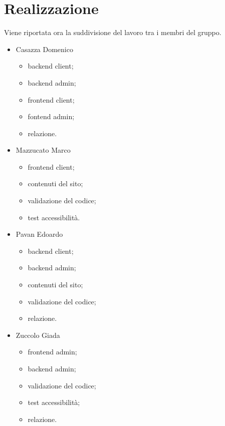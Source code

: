 \section{Realizzazione}
Viene riportata ora la suddivisione del lavoro tra i membri del gruppo.
\begin{itemize}
	\item Casazza Domenico
	\begin{itemize}
		\item backend client;
		\item backend admin;
		\item frontend client;
		\item fontend admin;
		\item relazione.
	\end{itemize}
	\item Mazzucato Marco
	\begin{itemize}
		\item frontend client;
		\item contenuti del sito;
		\item validazione del codice;
		\item test accessibilità.
	\end{itemize}	
	\item Pavan Edoardo
	\begin{itemize}
		\item backend client; 
		\item backend admin; 
		\item contenuti del sito;
		\item validazione del codice;
		\item relazione.
	\end{itemize}
	\item Zuccolo Giada
	\begin{itemize}
		\item frontend admin;
		\item backend admin;
		\item validazione del codice;
		\item test accessibilità;
		\item relazione. 
	\end{itemize}
\end{itemize}